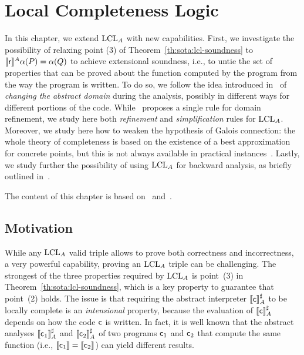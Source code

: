
\chapter{Local Completeness Logic}\label{ch:lcla}
In this chapter, we extend $\text{LCL}_A$ with new capabilities. First, we investigate the possibility of relaxing point (3) of Theorem~\ref{th:sota:lcl-soundness} to $\llbracket\mathsf{r}\rrbracket^{A} \alpha(P) = \alpha(Q)$ to achieve extensional soundness, i.e., to untie the set of properties that can be proved about the function computed by the program from the way the program is written. To do so, we follow the idea introduced in~\cite[§8]{BGGR23} of \emph{changing the abstract domain} during the analysis, possibly in different ways for different portions of the code.
While~\cite{BGGR23} proposes a single rule for domain refinement, we study here both \emph{refinement} and \emph{simplification} rules for $\text{LCL}_A$.
Moreover, we study here how to weaken the hypothesis of Galois connection: the whole theory of completeness is based on the existence of a best approximation for concrete points, but this is not always available in practical instances~\cite{CC92}.
Lastly, we study further the possibility of using $\text{LCL}_A$ for backward analysis, as briefly outlined in~\cite[\S 5.3]{BGGR23}.

The content of this chapter is based on~\cite{ABG23} and~\cite[\S 6]{ABGL24}.

\section{Motivation}
While any $\text{LCL}_A$ valid triple allows to prove both correctness and incorrectness, a very powerful capability, proving an $\text{LCL}_A$ triple can be challenging.
The strongest of the three properties required by $\text{LCL}_A$ is point~(3) in Theorem~\ref{th:sota:lcl-soundness}, which is a key property to guarantee that point~(2) holds.
The issue is that requiring the abstract interpreter $\llbracket\mathsf{c}\rrbracket^{\sharp}_{A}$ to be locally complete is an \emph{intensional} property, because the evaluation of $\llbracket\mathsf{c}\rrbracket^{\sharp}_{A}$ depends on how the code $\mathsf{c}$ is written.
In fact, it is well known that the abstract analyses $\llbracket\mathsf{c}_1\rrbracket^{\sharp}_{A}$ and $\llbracket\mathsf{c}_2\rrbracket^{\sharp}_{A}$ of two programs $\mathsf{c}_1$ and $\mathsf{c}_2$ that compute the same function (i.e., $\llbracket\mathsf{c}_1\rrbracket=\llbracket\mathsf{c}_2\rrbracket$) can yield different results.

